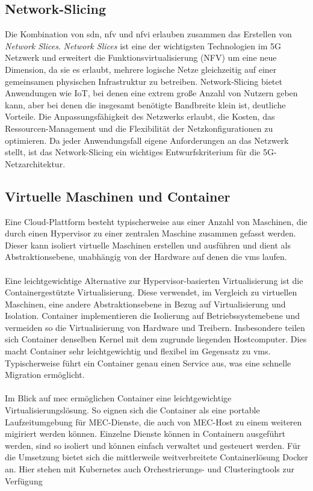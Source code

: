 \documentclass[runningheads]{llncs}
\numberwithin{figure}{section}
\begin{document}
\subsection{Network-Slicing}
\label{subsec:Network-Slicing}
Die Kombination von \acrshort{sdn}, \acrshort{nfv} und \acrshort{nfvi} erlauben zusammen das Erstellen von \textit{Network Slices}. \cite{BARAKABITZE2020106984} 
\textit{Network Slices} ist eine der wichtigsten Technologien im 5G Netzwerk und
 erweitert die Funktionsvirtualisierung (NFV) um eine neue Dimension, 
 da sie es erlaubt, mehrere logische Netze gleichzeitig auf einer gemeinsamen physischen Infrastruktur zu betreiben.
 Network-Slicing bietet Anwendungen wie IoT, bei denen eine extrem große Anzahl von Nutzern geben kann, 
 aber bei denen die insgesamt benötigte Bandbreite klein ist, deutliche Vorteile.
 Die Anpassungsfähigkeit des Netzwerks erlaubt, die Kosten, das Ressourcen-Management und die Flexibilität der Netzkonfigurationen zu optimieren. Da jeder Anwendungsfall
 eigene Anforderungen an das Netzwerk stellt, ist das Network-Slicing ein wichtiges Entwurfskriterium für die 5G-Netzarchitektur.


\subsection{Virtuelle Maschinen und Container}
\label{subsec:Virtuelle Maschinen und Container}
Eine Cloud-Plattform besteht typischerweise aus einer Anzahl von Maschinen, 
die durch einen Hypervisor zu einer zentralen Maschine zusammen gefasst werden.
Dieser kann isoliert virtuelle Maschinen erstellen und ausführen und dient als Abstraktionsebene, 
unabhängig von der Hardware auf denen die \acrshort{vm}s laufen.
\\
\\
Eine leichtgewichtige Alternative zur Hypervisor-basierten Virtualisierung ist die Containergestützte Virtualisierung. 
Diese verwendet, im Vergleich zu virtuellen Maschinen, eine andere Abstraktionsebene in Bezug auf Virtualisierung und Isolation. 
Container implementieren die Isolierung auf Betriebssystemebene und vermeiden so die Virtualisierung von Hardware und Treibern. 
Insbesondere teilen sich Container denselben Kernel mit dem zugrunde liegenden Hostcomputer. 
Dies macht Container sehr leichtgewichtig und flexibel im 
Gegensatz zu \acrshort{vm}s. Typischerweise führt ein Container genau einen Service aus, was eine schnelle Migration ermöglicht.
\\
\\
Im Blick auf \acrshort{mec} ermöglichen Container eine leichtgewichtige Virtualisierungslösung. So eignen sich die Container
als eine portable Laufzeitumgebung für MEC-Dienste, die auch von MEC-Host zu einem weiteren migiriert werden können.
Einzelne Dienste können in Containern ausgeführt werden, sind so isoliert und können einfach 
verwaltet und gesteuert werden. Für die Umsetzung bietet sich die mittlerweile weitverbreitete Containerlösung Docker an. Hier stehen mit 
Kubernetes auch Orchestrierungs- und Clusteringtools zur Verfügung \cite{morabitoConsolidateIoTEdge2018}
\end{document}
